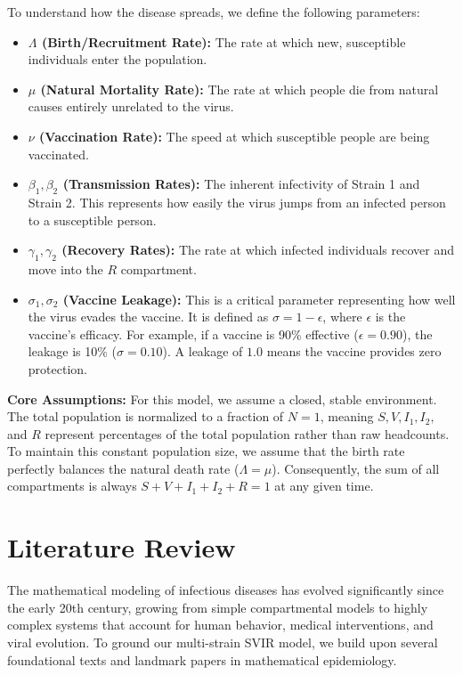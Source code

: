 \documentclass[12pt]{article}
\begin{document}
To understand how the disease spreads, we define the following parameters:
\begin{itemize}
    \item \textbf{$\Lambda$ (Birth/Recruitment Rate):} The rate at which new, susceptible individuals enter the population.
    \item \textbf{$\mu$ (Natural Mortality Rate):} The rate at which people die from natural causes entirely unrelated to the virus.
    \item \textbf{$\nu$ (Vaccination Rate):} The speed at which susceptible people are being vaccinated.
    \item \textbf{$\beta_1, \beta_2$ (Transmission Rates):} The inherent infectivity of Strain 1 and Strain 2. This represents how easily the virus jumps from an infected person to a susceptible person.
    \item \textbf{$\gamma_1, \gamma_2$ (Recovery Rates):} The rate at which infected individuals recover and move into the $R$ compartment.
    \item \textbf{$\sigma_1, \sigma_2$ (Vaccine Leakage):} This is a critical parameter representing how well the virus evades the vaccine. It is defined as $\sigma = 1 - \epsilon$, where $\epsilon$ is the vaccine's efficacy. For example, if a vaccine is 90\% effective ($\epsilon = 0.90$), the leakage is 10\% ($\sigma = 0.10$). A leakage of $1.0$ means the vaccine provides zero protection.
\end{itemize}

\textbf{Core Assumptions:} For this model, we assume a closed, stable environment. The total population is normalized to a fraction of $N=1$, meaning $S, V, I_1, I_2,$ and $R$ represent percentages of the total population rather than raw headcounts. To maintain this constant population size, we assume that the birth rate perfectly balances the natural death rate ($\Lambda = \mu$). Consequently, the sum of all compartments is always $S + V + I_1 + I_2 + R = 1$ at any given time.

\section{Literature Review}

The mathematical modeling of infectious diseases has evolved significantly since the early 20th century, growing from simple compartmental models to highly complex systems that account for human behavior, medical interventions, and viral evolution. To ground our multi-strain SVIR model, we build upon several foundational texts and landmark papers in mathematical epidemiology.
\end{document}
